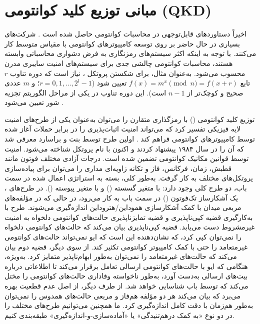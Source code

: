 \section{مبانی توزیع کلید کوانتومی (QKD)}
\label{sec:1-2}
اخیراً دستاوردهای قابل‌توجهی در محاسبات کوانتومی حاصل شده است \cite{1-9, 1-10, 1-11}. شرکت‌های بسیاری در حال حاضر بر روی توسعه کامپیوترهای کوانتومی با مقیاس متوسط کار می‌کنند. با توجه به اینکه اکثر سیستم‌های رمزنگاری به فرض دشواری محاسباتی وابسته هستند، محاسبات کوانتومی چالشی جدی برای سیستم‌های امنیت سایبری مدرن محسوب می‌شود. به‌عنوان مثال، برای شکستن پروتکل  \cite{1-26}، نیاز است که دوره تناوب $r$ تابع $f(x) = m^x \pmod n = f(x+r)$ تعیین شود ($r = 0, 1, \dots, 2^l - 1$؛ و $m$ عددی صحیح و کوچک‌تر از $n-1$ است). این دوره تناوب در یکی از مراحل الگوریتم تجزیه شور تعیین می‌شود \cite{1-9, 1-10, 1-11, 1-27, 1-28, 1-29}.

توزیع کلید کوانتومی () با رمزگذاری متقارن را می‌توان به‌عنوان یکی از طرح‌های امنیت لایه فیزیکی تفسیر کرد که می‌تواند امنیت اثبات‌پذیری را در برابر حملات آغاز شده توسط کامپیوترهای کوانتومی فراهم کند \cite{1-35}. اولین طرح  توسط بنت و براسارد معرفی شد که آن را در سال ۱۹۸۴ پیشنهاد کردند \cite{1-7, 1-8} و اکنون با نام پروتکل  شناخته می‌شود. امنیت  توسط قوانین مکانیک کوانتومی تضمین شده است. درجات آزادی مختلف فوتون مانند قطبش، زمان، فرکانس، فاز و تکانه زاویه‌ای مداری را می‌توان برای پیاده‌سازی پروتکل‌های مختلف  به کار گرفت. به‌طور کلی، بسته به استراتژی اعمال شده در سمت باب، دو طرح کلی  وجود دارد:  با متغیر گسسته () و  با متغیر پیوسته (). در طرح‌های ، یک آشکارساز تک‌فوتون () در سمت باب به کار می‌رود، در حالی که در  مؤلفه‌های مربعی میدان با کمک آشکارسازی هموداین/هتروداین اندازه‌گیری می‌شوند. طرح  با به‌کارگیری قضیه کپی‌ناپذیری و قضیه تمایزناپذیری حالت‌های کوانتومی دلخواه به امنیت غیرمشروط دست می‌یابد. قضیه کپی‌ناپذیری بیان می‌کند که حالت‌های کوانتومی دلخواه را نمی‌توان کپی کرد، که نشان‌دهنده این است که ایو نمی‌تواند حالت‌های کوانتومی غیرمتعامد را حتی با کمک کامپیوتر کوانتومی تکثیر کند. از سوی دیگر، قضیه دوم بیان می‌کند که حالت‌های غیرمتعامد را نمی‌توان به‌طور ابهام‌ناپذیر متمایز کرد. به‌ویژه، هنگامی که ایو با حالت‌های کوانتومی ارسالی تعامل برقرار می‌کند تا اطلاعاتی درباره بیت‌های ارسالی به‌دست آورد، به‌طور ناخواسته وفاداری حالت‌های کوانتومی را مختل می‌کند که توسط باب شناسایی خواهد شد. از طرف دیگر،  از اصل عدم قطعیت بهره می‌برد که بیان می‌کند هر دو مؤلفه هم‌فاز و مربعی حالت‌های همدوس را نمی‌توان به‌طور هم‌زمان با دقت کامل اندازه‌گیری کرد. ما همچنین می‌توانیم طرح‌های مختلف  را در دو نوع «به کمک درهم‌تنیدگی» یا «آماده‌سازی-و-اندازه‌گیری» طبقه‌بندی کنیم.

